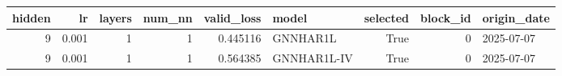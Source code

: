 \begin{tabular}{rrrrrlrrl}
\toprule
hidden & lr & layers & num_nn & valid_loss & model & selected & block_id & origin_date \\
\midrule
9 & 0.001 & 1 & 1 & 0.445116 & GNNHAR1L & True & 0 & 2025-07-07 \\
9 & 0.001 & 1 & 1 & 0.564385 & GNNHAR1L-IV & True & 0 & 2025-07-07 \\
\bottomrule
\end{tabular}
